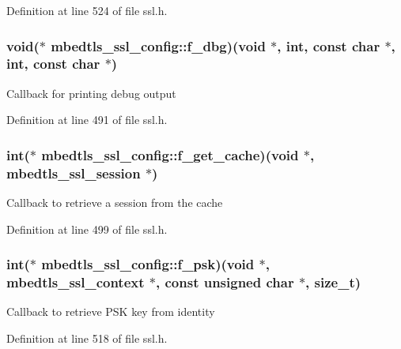 Definition at line 524 of file ssl.\-h.

\hypertarget{structmbedtls__ssl__config_acc35711af502ca74adcfd706677110fc}{
\subsubsection[{f\-\_\-dbg}]{\setlength{\rightskip}{0pt plus 5cm}void($\ast$ mbedtls\-\_\-ssl\-\_\-config\-::f\-\_\-dbg)(void $\ast$, int, const char $\ast$, int, const char $\ast$)}}\label{structmbedtls__ssl__config_acc35711af502ca74adcfd706677110fc}
Callback for printing debug output 

Definition at line 491 of file ssl.\-h.

\hypertarget{structmbedtls__ssl__config_a8675186fe7701399b2d8c1a0c548ed79}{
\subsubsection[{f\-\_\-get\-\_\-cache}]{\setlength{\rightskip}{0pt plus 5cm}int($\ast$ mbedtls\-\_\-ssl\-\_\-config\-::f\-\_\-get\-\_\-cache)(void $\ast$, {\bf mbedtls\-\_\-ssl\-\_\-session} $\ast$)}}\label{structmbedtls__ssl__config_a8675186fe7701399b2d8c1a0c548ed79}
Callback to retrieve a session from the cache 

Definition at line 499 of file ssl.\-h.

\hypertarget{structmbedtls__ssl__config_aa910c0bbe6ec2a3787196faaef2e5ac3}{
\subsubsection[{f\-\_\-psk}]{\setlength{\rightskip}{0pt plus 5cm}int($\ast$ mbedtls\-\_\-ssl\-\_\-config\-::f\-\_\-psk)(void $\ast$, {\bf mbedtls\-\_\-ssl\-\_\-context} $\ast$, const unsigned char $\ast$, size\-\_\-t)}}\label{structmbedtls__ssl__config_aa910c0bbe6ec2a3787196faaef2e5ac3}
Callback to retrieve P\-S\-K key from identity 

Definition at line 518 of file ssl.\-h.

